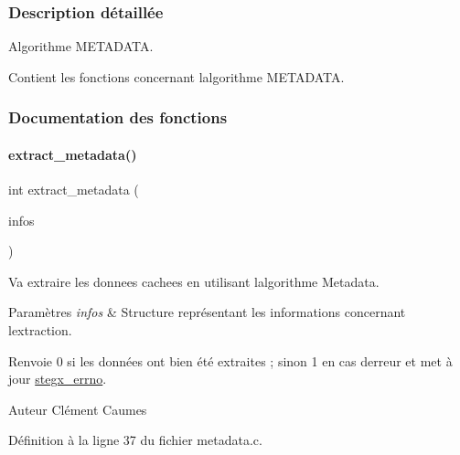 \subsubsection{Description détaillée}
Algorithme M\+E\+T\+A\+D\+A\+TA. 

Contient les fonctions concernant l\textquotesingle{}algorithme M\+E\+T\+A\+D\+A\+TA. 

\subsubsection{Documentation des fonctions}
\mbox{\label{a00041_a069239660c8070698c4ddcbbd6debe0b}} 
\paragraph{\texorpdfstring{extract\+\_\+metadata()}{extract\_metadata()}}
{\footnotesize\ttfamily int extract\+\_\+metadata (\begin{DoxyParamCaption}\item[{\hyperlink{a00008_aa8ca908d92fb5bdd3c0a9e1f58b2cf03}{info\+\_\+s} $\ast$}]{infos }\end{DoxyParamCaption})}



Va extraire les donnees cachees en utilisant l\textquotesingle{}algorithme Metadata. 


\begin{DoxyParams}{Paramètres}
{\em infos} & Structure représentant les informations concernant l\textquotesingle{}extraction. \\
\hline
\end{DoxyParams}
\begin{DoxyReturn}{Renvoie}
0 si les données ont bien été extraites ; sinon 1 en cas d\textquotesingle{}erreur et met à jour \hyperlink{a00062_a5ec48ccdfbe19fe23855818f8556abec}{stegx\+\_\+errno}. 
\end{DoxyReturn}
\begin{DoxyAuthor}{Auteur}
Clément Caumes 
\end{DoxyAuthor}


Définition à la ligne 37 du fichier metadata.\+c.

